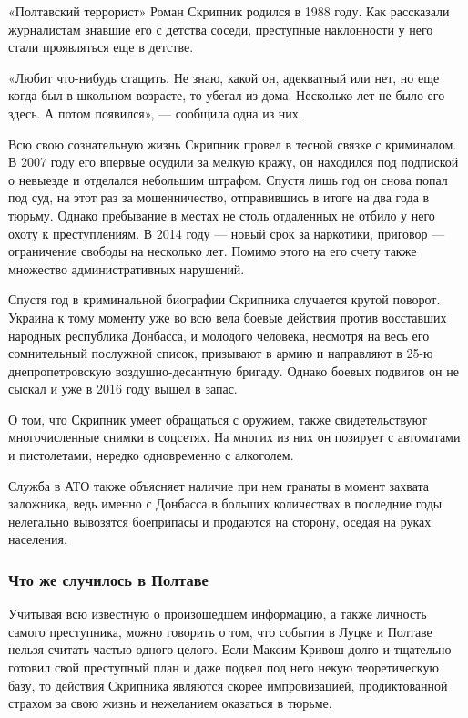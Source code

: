 «Полтавский террорист» Роман Скрипник родился в 1988 году. Как рассказали
журналистам знавшие его с детства соседи, преступные наклонности у него стали
проявляться еще в детстве.

«Любит что-нибудь стащить. Не знаю, какой он, адекватный или нет, но еще когда
был в школьном возрасте, то убегал из дома. Несколько лет не было его здесь. А
потом появился», — сообщила одна из них.

Всю свою сознательную жизнь Скрипник провел в тесной связке с криминалом. В
2007 году его впервые осудили за мелкую кражу, он находился под подпиской о
невыезде и отделался небольшим штрафом. Спустя лишь год он снова попал под суд,
на этот раз за мошенничество, отправившись в итоге на два года в тюрьму. Однако
пребывание в местах не столь отдаленных не отбило у него охоту к преступлениям.
В 2014 году — новый срок за наркотики, приговор — ограничение свободы на
несколько лет. Помимо этого на его счету также множество административных
нарушений.

Спустя год в криминальной биографии Скрипника случается крутой поворот. Украина
к тому моменту уже во всю вела боевые действия против восставших народных
республика Донбасса, и молодого человека, несмотря на весь его сомнительный
послужной список, призывают в армию и направляют в 25-ю днепропетровскую
воздушно-десантную бригаду. Однако боевых подвигов он не сыскал и уже в 2016
году вышел в запас.

О том, что Скрипник умеет обращаться с оружием, также свидетельствуют
многочисленные снимки в соцсетях. На многих из них он позирует с автоматами и
пистолетами, нередко одновременно с алкоголем.

Служба в АТО также объясняет наличие при нем гранаты в момент захвата
заложника, ведь именно с Донбасса в больших количествах в последние годы
нелегально вывозятся боеприпасы и продаются на сторону, оседая на руках
населения.

\subsubsection{Что же случилось в Полтаве}

Учитывая всю известную о произошедшем информацию, а также личность самого
преступника, можно говорить о том, что события в Луцке и Полтаве нельзя считать
частью одного целого. Если Максим Кривош долго и тщательно готовил свой
преступный план и даже подвел под него некую теоретическую базу, то действия
Скрипника являются скорее импровизацией, продиктованной страхом за свою жизнь и
нежеланием оказаться в тюрьме.

